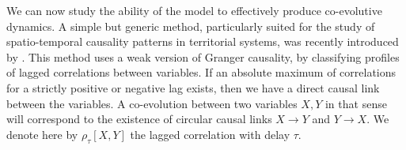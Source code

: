 

We can now study the ability of the model to effectively produce co-evolutive dynamics. A simple but generic method, particularly suited for the study of spatio-temporal causality patterns in territorial systems, was recently introduced by \cite{raimbault2017identification}. This method uses a weak version of Granger causality, by classifying profiles of lagged correlations between variables. If an absolute maximum of correlations for a strictly positive or negative lag exists, then we have a direct causal link between the variables. A co-evolution between two variables $X,Y$ in that sense will correspond to the existence of circular causal links $X\rightarrow Y$ and $Y\rightarrow X$. We denote here by $\rho_{\tau}\left[X,Y\right]$ the lagged correlation with delay $\tau$.


